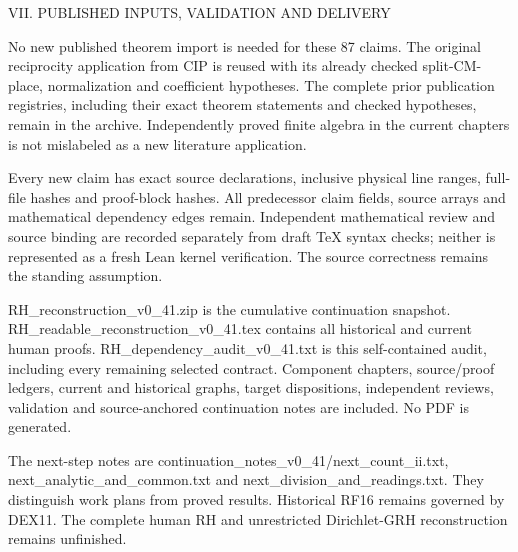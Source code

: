 VII. PUBLISHED INPUTS, VALIDATION AND DELIVERY

No new published theorem import is needed for these 87 claims. The original reciprocity application from CIP is reused with its already checked split-CM-place, normalization and coefficient hypotheses. The complete prior publication registries, including their exact theorem statements and checked hypotheses, remain in the archive. Independently proved finite algebra in the current chapters is not mislabeled as a new literature application.

Every new claim has exact source declarations, inclusive physical line ranges, full-file hashes and proof-block hashes. All predecessor claim fields, source arrays and mathematical dependency edges remain. Independent mathematical review and source binding are recorded separately from draft TeX syntax checks; neither is represented as a fresh Lean kernel verification. The source correctness remains the standing assumption.

RH\_\allowbreak{}reconstruction\_\allowbreak{}v0\_\allowbreak{}41.zip is the cumulative continuation snapshot. RH\_\allowbreak{}readable\_\allowbreak{}reconstruction\_\allowbreak{}v0\_\allowbreak{}41.tex contains all historical and current human proofs. RH\_\allowbreak{}dependency\_\allowbreak{}audit\_\allowbreak{}v0\_\allowbreak{}41.txt is this self-contained audit, including every remaining selected contract. Component chapters, source/\allowbreak{}proof ledgers, current and historical graphs, target dispositions, independent reviews, validation and source-anchored continuation notes are included. No PDF is generated.

The next-step notes are continuation\_\allowbreak{}notes\_\allowbreak{}v0\_\allowbreak{}41/\allowbreak{}next\_\allowbreak{}count\_\allowbreak{}ii.txt, next\_\allowbreak{}analytic\_\allowbreak{}and\_\allowbreak{}common.txt and next\_\allowbreak{}division\_\allowbreak{}and\_\allowbreak{}readings.txt. They distinguish work plans from proved results. Historical RF16 remains governed by DEX11. The complete human RH and unrestricted Dirichlet-GRH reconstruction remains unfinished.
